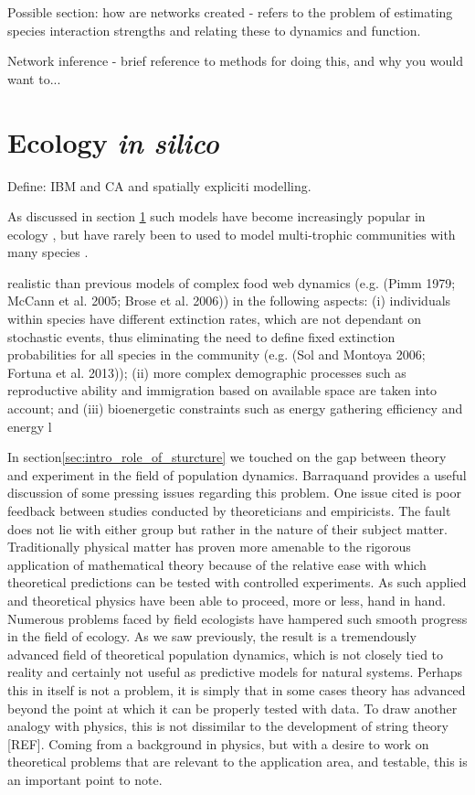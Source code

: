 Possible section: how are networks created - refers to the problem of estimating species interaction strengths and relating these to dynamics and function.

Network inference - brief reference to methods for doing this, and why you would want to...

\section{Ecology \emph{in silico}}
\label{sec:intro_computers}

Define: IBM and CA and spatially expliciti modelling.

 As discussed in section \ref{sec:intro_computers} such models have become increasingly popular in ecology \cite{judson1994rise}, but have rarely been to used to model multi-trophic communities with many species \cite{lurgi2015effects,grimm2013individual}.

realistic than previous models of complex food web dynamics
(e.g. (Pimm 1979; McCann et al. 2005; Brose et al. 2006)) in the
following aspects: (i) individuals within species have different
extinction rates, which are not dependant on stochastic events,
thus eliminating the need to define fixed extinction probabilities
for all species in the community (e.g. (Sol and Montoya 2006;
Fortuna et al. 2013)); (ii) more complex demographic processes
such as reproductive ability and immigration based on available
space are taken into account; and (iii) bioenergetic constraints
such as energy gathering efficiency and energy l

In section\ref{sec:intro_role_of_sturcture} we touched on the gap between theory and experiment in the field of population dynamics. Barraquand \cite{barraquand2014functional} provides a useful  discussion of some pressing issues regarding this problem. One issue cited is poor feedback between studies conducted by theoreticians and empiricists. The fault does not lie with either group but rather in the nature of their subject matter. Traditionally physical matter has proven more amenable to the rigorous application of mathematical theory because of the relative ease with which theoretical predictions can be tested with controlled experiments. As such applied and theoretical physics have been able to proceed, more or less, hand in hand. Numerous problems faced by field ecologists have hampered such smooth progress in the field of ecology. As we saw previously, the result is a tremendously advanced field of theoretical population dynamics, which is not closely tied to reality and certainly not useful as predictive models for natural systems. Perhaps this in itself is not a problem, it is simply that in some cases theory has advanced beyond the point at which it can be properly tested with data. To draw another analogy with physics, this is not dissimilar to the development of string theory [REF]. Coming from a background in physics, but with a desire to work on theoretical problems that are relevant to the application area, and testable, this is an important point to note.      

